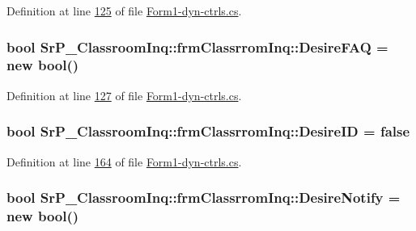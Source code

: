 \-Definition at line \hyperlink{_form1-dyn-ctrls_8cs_source_l00125}{125} of file \hyperlink{_form1-dyn-ctrls_8cs_source}{\-Form1-\/dyn-\/ctrls.\-cs}.

\hypertarget{class_sr_p___classroom_inq_1_1frm_classrrom_inq_ac893a3454dc239c417d6a1e67882d0cb}{
\subsubsection[{\-Desire\-F\-A\-Q}]{\setlength{\rightskip}{0pt plus 5cm}bool {\bf \-Sr\-P\-\_\-\-Classroom\-Inq\-::frm\-Classrrom\-Inq\-::\-Desire\-F\-A\-Q} = new bool()}}
\label{class_sr_p___classroom_inq_1_1frm_classrrom_inq_ac893a3454dc239c417d6a1e67882d0cb}


\-Definition at line \hyperlink{_form1-dyn-ctrls_8cs_source_l00127}{127} of file \hyperlink{_form1-dyn-ctrls_8cs_source}{\-Form1-\/dyn-\/ctrls.\-cs}.

\hypertarget{class_sr_p___classroom_inq_1_1frm_classrrom_inq_aad36cc9a93fb79969dd3b0d0fe52b793}{
\subsubsection[{\-Desire\-I\-D}]{\setlength{\rightskip}{0pt plus 5cm}bool {\bf \-Sr\-P\-\_\-\-Classroom\-Inq\-::frm\-Classrrom\-Inq\-::\-Desire\-I\-D} = false}}
\label{class_sr_p___classroom_inq_1_1frm_classrrom_inq_aad36cc9a93fb79969dd3b0d0fe52b793}


\-Definition at line \hyperlink{_form1-dyn-ctrls_8cs_source_l00164}{164} of file \hyperlink{_form1-dyn-ctrls_8cs_source}{\-Form1-\/dyn-\/ctrls.\-cs}.

\hypertarget{class_sr_p___classroom_inq_1_1frm_classrrom_inq_a39e6b524ac1f9239b638d8c3fe0fca7e}{
\subsubsection[{\-Desire\-Notify}]{\setlength{\rightskip}{0pt plus 5cm}bool {\bf \-Sr\-P\-\_\-\-Classroom\-Inq\-::frm\-Classrrom\-Inq\-::\-Desire\-Notify} = new bool()}}
\label{class_sr_p___classroom_inq_1_1frm_classrrom_inq_a39e6b524ac1f9239b638d8c3fe0fca7e}


